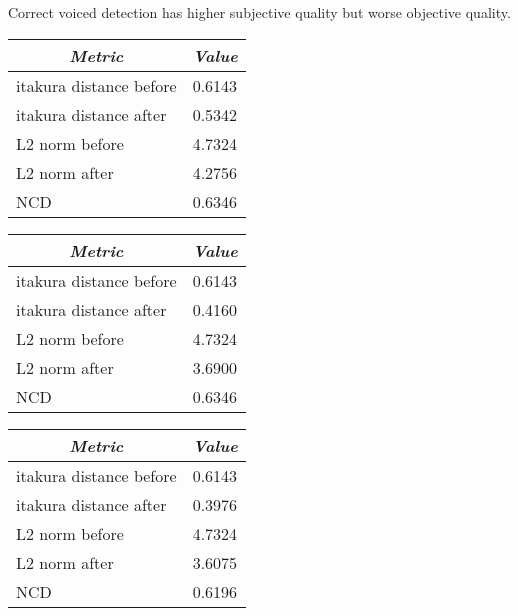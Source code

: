 Correct voiced detection has higher subjective quality but worse objective quality.

\begin{table}[htbp]
	\begin{center}
		\begin{tabular}{ll}
			\toprule
			\multicolumn{1}{c}{\emph{Metric}} & \multicolumn{1}{c}{\emph{Value}} \\
			\midrule
			itakura distance before & 0.6143 \\
			itakura distance after & 0.5342 \\
			L2 norm before & 4.7324\\
			L2 norm after & 4.2756 \\
			NCD & 0.6346 \\
			\bottomrule			
		\end{tabular}		
	\end{center}
\label{tab:frequency_transform_for_unvoiced_frames3}	
\end{table}


\begin{table}[htbp]
	\begin{center}
		\begin{tabular}{ll}
			\toprule
			\multicolumn{1}{c}{\emph{Metric}} & \multicolumn{1}{c}{\emph{Value}} \\
			\midrule
			itakura distance before & 0.6143 \\
			itakura distance after & 0.4160 \\
			L2 norm before & 4.7324\\
			L2 norm after & 3.6900 \\
			NCD & 0.6346 \\
			\bottomrule			
		\end{tabular}		
	\end{center}
\label{tab:frequency_transform_powerspec}	
\end{table}

\begin{table}[htbp]
	\begin{center}
		\begin{tabular}{ll}
			\toprule
			\multicolumn{1}{c}{\emph{Metric}} & \multicolumn{1}{c}{\emph{Value}} \\
			\midrule
			itakura distance before & 0.6143 \\
			itakura distance after & 0.3976 \\
			L2 norm before & 4.7324\\
			L2 norm after & 3.6075 \\
			NCD & 0.6196 \\
			\bottomrule			
		\end{tabular}		
	\end{center}
\label{tab:frequency_transform_powerspec2}	
\end{table}
